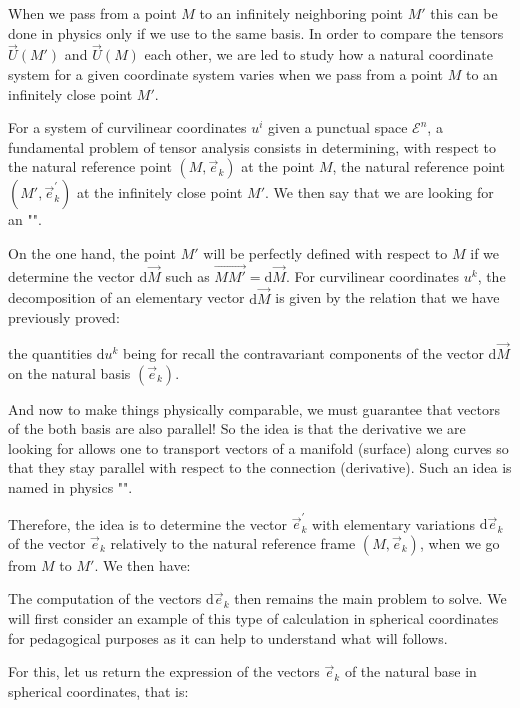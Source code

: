 	When we pass from a point $M$ to an infinitely neighboring point $M'$ this can be done in physics only if we use to the same basis. In order to compare the tensors $\vec{U}(M')$ and $\vec{U}(M)$ each other, we are led to study how a natural coordinate system for a given coordinate system varies when we pass from a point $M$ to an infinitely close point $M'$.
	
	For a system of curvilinear coordinates $u^i$ given a punctual space $\mathcal{E}^n$, a fundamental problem of tensor analysis consists in determining, with respect to the natural reference point $(M,\vec{e}_k)$ at the point $M$, the natural reference point $(M',\vec{e}_k^{'})$ at the infinitely close point $M'$. We then say that we are looking for an "".
	
	On the one hand, the point $M'$ will be perfectly defined with respect to $M$ if we determine the vector $\mathrm{d}\vec{M}$ such as $\overrightarrow{MM'}=\mathrm{d}\vec{M}$. For curvilinear coordinates $u^k$, the decomposition of an elementary vector $\mathrm{d}\vec{M}$ is given by the relation that we have previously proved:
	
	the quantities $\mathrm{d}u^k$ being for recall the contravariant components of the vector $\mathrm{d}\vec{M}$ on the natural basis $(\vec{e}_k)$.
	
	And now to make things physically comparable, we must guarantee that vectors of the both basis are also parallel! So the idea is that the derivative we are looking for allows one to transport vectors of a manifold (surface) along curves so that they stay parallel with respect to the connection (derivative). Such an idea is named in physics "".

	Therefore, the idea is to determine the vector $\vec{e}_k^{'}$ with elementary variations $\mathrm{d}\vec{e}_k$ of the vector $\vec{e}_k$ relatively to the natural reference frame $(M,\vec{e}_k)$, when we go from $M$ to $M'$. We then have:
	
	The computation of the vectors $\mathrm{d}\vec{e}_k$ then remains the main problem to solve. We will first consider an example of this type of calculation in spherical coordinates for pedagogical purposes as it can help to understand what will follows.

For this, let us return the expression of the vectors $\vec{e}_k$ of the natural base in spherical coordinates, that is:
	
